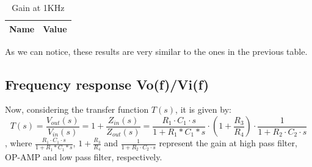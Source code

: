\begin{table}[H]
  \centering
  \begin{tabular}{|l|r|}
     \hline    
    {\bf Name} & {\bf Value} \\ \hline   
    
  \end{tabular}
  \caption{Gain at 1KHz}
  \label{tab:results3}
\end{table}
As we can notice, these results are very similar to the ones in the previous table.
\subsection{Frequency response Vo(f)/Vi(f)}
Now, considering the transfer function $T(s)$, it is given by:
\begin{equation}
	T(s)=\frac{V_{out}(s)}{V_{in}(s)}=1+\frac{Z_{in}(s)}{Z_{out}(s)}=\frac{R_1\cdot C_1 \cdot s}{1+R_1*C_1*s}\cdot(1+ \frac{R_3}{R_4}) \cdot \frac{1}{1+R_2 \cdot C_2\cdot s}
\end{equation}
, where $\frac{R_1\cdot C_1 \cdot s}{1+R_1*C_1*s}$, $1+\frac{R_3}{R_4}$ and $\frac{1}{1+R_2\cdot C_2\cdot s}$ represent
the gain at high pass filter, OP-AMP and low pass filter, respectively.

